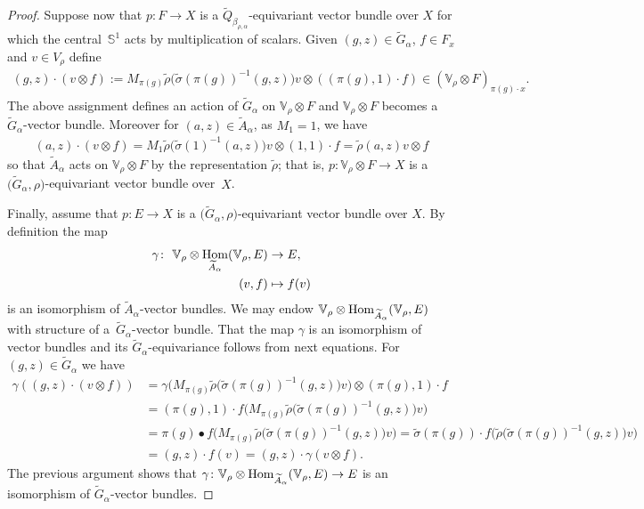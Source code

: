 \documentclass[11pt]{article}
\numberwithin{equation}{section}
\def\S{\mathbb{S}}
\def\V{\mathbb{V}}
\DeclareMathOperator{\Hom}{\textup{Hom}}
\theoremstyle{definition}
\numberwithin{equation}{section}
\begin{document}
\begin{proof}
Suppose now that $p \colon F \rightarrow X$ is a
$\widetilde{Q}_{\beta_{\rho,\alpha}}$-equivariant vector bundle over $X$
for which the central~$\S^{1}$ acts by multiplication of
scalars. Given $(g,z)\in \widetilde{G}_{\alpha}$, $f\in F_{x}$ and $v\in
V_{\rho}$ define
\begin{gather}
(g,z)\cdot (v\otimes f):=M_{\pi(g)}\tilde{\rho}\big(\tilde{\sigma}(\pi(g))^{-1}(g,z)\big)v\otimes
((\pi(g),1)\cdot f)\in (\V_{\rho}\otimes F)_{\pi(g)\cdot x}.
\label{ecu:ac2}
\end{gather}
The above assignment defines an action of $\widetilde{G}_{\alpha}$
on $\V_{\rho}\otimes F$ and $\V_{\rho}\otimes F$
becomes a $\widetilde{G}_{\alpha}$-vector bundle.
Moreover for $(a,z)\in \widetilde{A}_{\alpha}$, as $M_{1}=1$, we have
\begin{gather*}
(a,z)\cdot (v\otimes
f)=M_{1}\tilde{\rho}\big(\tilde{\sigma}(1)^{-1}(a,z)\big)v\otimes
(1,1)\cdot f=\tilde{\rho}(a,z)v\otimes f
\end{gather*}
so that $\widetilde{A}_{\alpha}$ acts on $\V_{\rho}\otimes
F$ by the representation $\tilde{\rho}$; that is,
$p\colon \V_{\rho}\otimes F\rightarrow X$ is a
$\big(\widetilde{G}_{\alpha},\rho\big)$-equivariant vector bundle
over~$X$.
	
Finally, assume that $p\colon E \rightarrow X$ is a
$\big(\widetilde{G}_{\alpha},\rho\big)$-equivariant vector bundle over $X$.
By definition the map
\begin{align*}
\gamma\colon \ \V_{\rho}\otimes
\Hom_{\widetilde{A}_{\alpha}}(\V_{\rho},E)&\rightarrow E,
\\
(v,f)&\mapsto f(v)
\end{align*}
is an isomorphism of $\widetilde{A}_{\alpha}$-vector bundles. We may endow
$\V_{\rho}\otimes\Hom_{\widetilde{A}_{\alpha}}(\V_{\rho},E)$
with structure of a~$\widetilde{G}_{\alpha}$-vector bundle. That the map
$\gamma$ is an isomorphism of vector bundles and its
$\widetilde{G}_{\alpha}$-equivariance follows from next equations.
For $(g,z)\in \widetilde{G}_{\alpha}$ we have
\begin{align*}
\gamma((g,z)\cdot(v\otimes
f))&=\gamma\big(M_{\pi(g)}\tilde{\rho}\big(\tilde{\sigma}(\pi(g))^{-1}(g,z)\big)v\big)\otimes
(\pi(g),1)\cdot f\\
&=(\pi(g),1)\cdot f
\big(M_{\pi(g)}\tilde{\rho}\big(\tilde{\sigma}(\pi(g))^{-1}(g,z)\big)v\big)\\
&=\pi(g)\bullet\!
f\big(M_{\pi(g)}\tilde{\rho}\big(\tilde{\sigma}(\pi(g))^{-1}(g,z)\big)v\big)
\!=\tilde{\sigma}(\pi(g))\!\cdot
f\big(\tilde{\rho}\big(\tilde{\sigma}(\pi(g))^{-1}(g,z)\big)v\big)\\
	&=(g,z)\cdot f(v)=(g,z)\cdot\gamma(v\otimes f).
\end{align*}
The previous argument shows that $\gamma\colon
\V_{\rho}\otimes
\Hom_{\widetilde{A}_{\alpha}}(\V_{\rho},E)\rightarrow
E$ is an isomorphism of $\widetilde{G}_{\alpha}$-vector bundles.
	

\end{proof}
\end{document}
